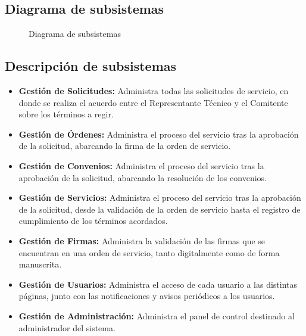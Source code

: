 \subsection[Diagrama]{Diagrama de subsistemas}
\begin{figure}[H]
 	\begin{center}
	\end{center}
	\caption{
		Diagrama de subsistemas
	}
\end{figure}
\subsection[Descripci\'on]
	{Descripci\'on de subsistemas}
\begin{itemize}
	\item \textbf{Gesti\'on de Solicitudes:}
	Administra todas las solicitudes de servicio,
	en donde se realiza el acuerdo entre el
	Representante T\'ecnico y el Comitente sobre
	los t\'erminos a regir.
	\item \textbf{Gesti\'on de \'Ordenes:}
	Administra el proceso del servicio tras la
	aprobaci\'on de la solicitud, abarcando la
	firma de la orden de servicio.
	\item \textbf{Gesti\'on de Convenios:}
	Administra el proceso del servicio tras la
	aprobaci\'on de la solicitud, abarcando la
	resoluci\'on de los convenios.
	\item \textbf{Gesti\'on de Servicios:}
	Administra el proceso del servicio tras la
	aprobaci\'on de la solicitud, desde la
	validaci\'on de la orden de servicio hasta
	el registro de cumplimiento de los t\'erminos
	acordados.
	\item \textbf{Gesti\'on de Firmas:}
	Administra la validaci\'on de las firmas
	que se encuentran en una orden de servicio,
	tanto digitalmente como de forma manuscrita.
	\item \textbf{Gesti\'on de Usuarios:}
	Administra el acceso de cada usuario a las
	distintas p\'aginas, junto con las
	notificaciones y avisos peri\'odicos a los
	usuarios.
	\item \textbf{Gesti\'on de Administraci\'on:}
	Administra el panel de control destinado al
	administrador del sistema.
\end{itemize}
